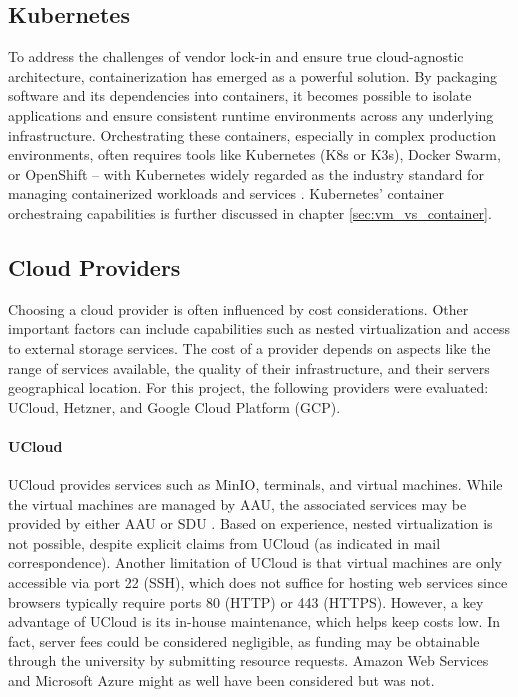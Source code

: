 \subsection{Kubernetes}

To address the challenges of vendor lock-in and ensure true cloud-agnostic architecture, containerization has emerged as a powerful solution. By packaging software and its dependencies into containers, it becomes possible to isolate applications and ensure consistent runtime environments across any underlying infrastructure. Orchestrating these containers, especially in complex production environments, often requires tools like Kubernetes (K8s or K3s), Docker Swarm, or OpenShift -- with Kubernetes widely regarded as the industry standard for managing containerized workloads and services \Parencite{opsramp_kubernetes_origin}. Kubernetes' container orchestraing capabilities is further discussed in chapter \ref{sec:vm_vs_container}.

\subsection{Cloud Providers}\label{sec:cloud_providers}

Choosing a cloud provider is often influenced by cost considerations. Other important factors can include capabilities such as nested virtualization and access to external storage services. The cost of a provider depends on aspects like the range of services available, the quality of their infrastructure, and their servers geographical location. For this project, the following providers were evaluated: UCloud, Hetzner, and Google Cloud Platform (GCP).

\paragraph{UCloud} UCloud provides services such as MinIO, terminals, and virtual machines. While the virtual machines are managed by AAU, the associated services may be provided by either AAU or SDU \Parencite{sdu_cloud_providers}. Based on experience, nested virtualization is not possible, despite explicit claims from UCloud (as indicated in mail correspondence). Another limitation of UCloud is that virtual machines are only accessible via port 22 (SSH), which does not suffice for hosting web services since browsers typically require ports 80 (HTTP) or 443 (HTTPS). However, a key advantage of UCloud is its in-house maintenance, which helps keep costs low. In fact, server fees could be considered negligible, as funding may be obtainable through the university by submitting resource requests. Amazon Web Services and Microsoft Azure might as well have been considered but was not. 

